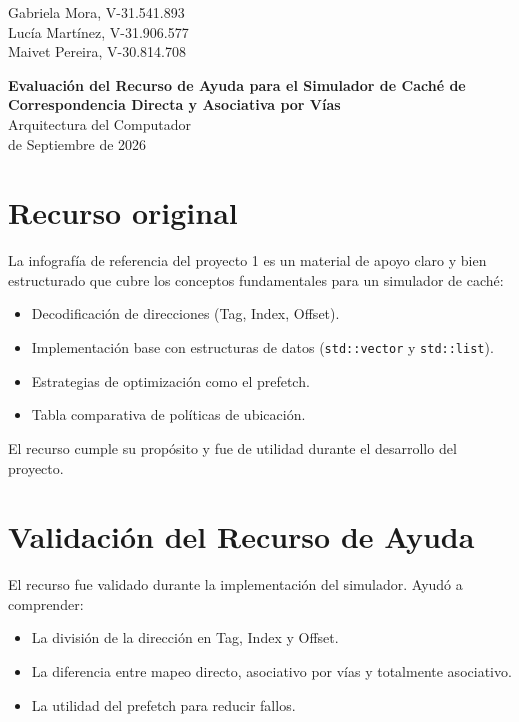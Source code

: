 \documentclass[12pt]{article}
\renewcommand{\large}{\fontsize{15}{18}\selectfont}
\renewcommand{\LARGE}{\fontsize{21}{25}\selectfont}
\begin{document}
\begin{flushright}
\large
Gabriela Mora, V-31.541.893 \\
Lucía Martínez, V-31.906.577 \\
Maivet Pereira, V-30.814.708 \\
\end{flushright}

\vspace{0.4cm}

\begin{center}
    {\LARGE \textbf{Evaluación del Recurso de Ayuda para el Simulador de Caché de Correspondencia Directa y Asociativa por Vías}} \\[0.3cm]
    \large Arquitectura del Computador \\[0.2cm]
    \large 1 de Septiembre de 2026
\end{center}

\vspace{0.4cm}

\section*{Recurso original}

La infografía de referencia del proyecto 1 es un material de apoyo claro y bien estructurado que cubre los conceptos fundamentales para un simulador de caché:

\begin{itemize}
    \item Decodificación de direcciones (Tag, Index, Offset).
    \item Implementación base con estructuras de datos (\texttt{std::vector} y \texttt{std::list}).
    \item Estrategias de optimización como el prefetch.
    \item Tabla comparativa de políticas de ubicación.
\end{itemize}

El recurso cumple su propósito y fue de utilidad durante el desarrollo del proyecto.

\section*{Validación del Recurso de Ayuda}

El recurso fue validado durante la implementación del simulador. Ayudó a comprender:

\begin{itemize}
    \item La división de la dirección en Tag, Index y Offset.
    \item La diferencia entre mapeo directo, asociativo por vías y totalmente asociativo.
    \item La utilidad del prefetch para reducir fallos.
\end{itemize}
\end{document}
